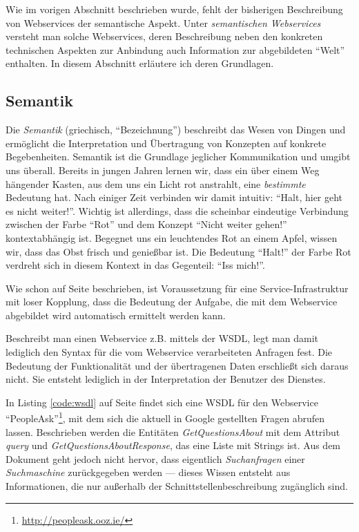 Wie im vorigen Abschnitt beschrieben wurde, fehlt der bisherigen Beschreibung von Webservices der semantische Aspekt. Unter \emph{semantischen Webservices} versteht man solche Webservices, deren Beschreibung neben den konkreten technischen Aspekten zur Anbindung auch Information zur abgebildeten "`Welt"' enthalten. In diesem Abschnitt erläutere ich deren Grundlagen.

\subsection{Semantik}

Die \emph{Semantik} (griechisch, "`Bezeichnung"') beschreibt das Wesen von Dingen und ermöglicht die Interpretation und Übertragung von Konzepten auf konkrete Begebenheiten. Semantik ist die Grundlage jeglicher Kommunikation und umgibt uns überall. Bereits in jungen Jahren lernen wir, dass ein über einem Weg hängender Kasten, aus dem uns ein Licht rot anstrahlt, eine \emph{bestimmte} Bedeutung hat. Nach einiger Zeit verbinden wir damit intuitiv: "`Halt, hier geht es nicht weiter!"'. Wichtig ist allerdings, dass die scheinbar eindeutige Verbindung zwischen der Farbe "`Rot"' und dem Konzept "`Nicht weiter gehen!"' kontextabhängig ist. Begegnet uns ein leuchtendes Rot an einem Apfel, wissen wir, dass das Obst frisch und genießbar ist. Die Bedeutung "`Halt!"' der Farbe Rot verdreht sich in diesem Kontext in das Gegenteil: "`Iss mich!"'.

Wie schon auf Seite \pageref{l:intro-loosecoupling} beschrieben, ist Voraussetzung für eine Service-Infrastruktur mit loser Kopplung, dass die Bedeutung der Aufgabe, die mit dem Webservice abgebildet wird automatisch ermittelt werden kann.

Beschreibt man einen Webservice z.B. mittels der \ac{WSDL}, legt man damit lediglich den Syntax für die vom Webservice verarbeiteten Anfragen fest. Die Bedeutung der Funktionalität und der übertragenen Daten erschließt sich daraus nicht. Sie entsteht lediglich in der Interpretation der Benutzer des Dienstes. 

In Listing \ref{code:wsdl} auf Seite \pageref{code:wsdl} findet sich eine \ac{WSDL} für den Webservice "`PeopleAsk"'\footnote{\url{http://peopleask.ooz.ie/}}, mit dem sich die aktuell in Google gestellten Fragen abrufen lassen. Beschrieben werden die Entitäten \emph{GetQuestionsAbout} mit dem Attribut \emph{query} und \emph{GetQuestionsAboutResponse}, das eine Liste mit Strings ist. Aus dem Dokument geht jedoch nicht hervor, dass eigentlich \emph{Suchanfragen} einer \emph{Suchmaschine} zurückgegeben werden --- dieses Wissen entsteht aus Informationen, die nur außerhalb der Schnittstellenbeschreibung zugänglich sind.

